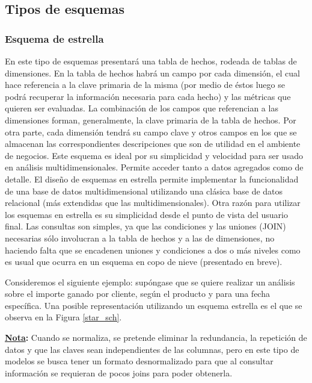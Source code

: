 \documentclass[a4paper,11pt]{article}
\begin{document}
    
    \subsection{Tipos de esquemas}
    
    \subsubsection{Esquema de estrella}
    
    En este tipo de esquemas presentará una tabla de hechos, rodeada de tablas de dimensiones. En la tabla de hechos habrá un campo por cada dimensión, el
    cual hace referencia a la clave primaria de la misma (por medio de éstos luego se podrá recuperar la información necesaria para cada hecho) 
    y las métricas que quieren ser evaluadas. La combinación de los campos que referencian a las dimensiones forman, generalmente, la clave primaria de la
    tabla de hechos. Por otra parte, cada dimensión tendrá su campo clave y otros campos en los que se almacenan las correspondientes descripciones que son 
    de utilidad en el ambiente de negocios. Este esquema es ideal por su simplicidad y velocidad para ser usado en análisis multidimensionales. Permite 
    acceder tanto a datos agregados como de detalle. El diseño de esquemas en estrella permite implementar la funcionalidad de una base de datos 
    multidimensional utilizando una clásica base de datos relacional (más extendidas que las multidimensionales). Otra razón para utilizar los esquemas en 
    estrella es su simplicidad desde el punto de vista del usuario final. Las consultas son simples, ya que las condiciones y las uniones (JOIN) 
    necesarias sólo involucran a la tabla de hechos y a las de dimensiones, no haciendo falta que se encadenen uniones y condiciones a dos o más niveles como 
    es usual que ocurra en un esquema en copo de nieve (presentado en breve).\par
    Consideremos el siguiente ejemplo: supóngase que se quiere realizar un análisis sobre el importe ganado por cliente, según el producto y para una fecha
    específica. Una posible representación utilizando un esquema estrella es el que se observa en la Figura \ref{star_sch}.\par
    
    \textbf{\underline{Nota}:} Cuando se normaliza, se pretende eliminar la redundancia, la repetición de datos y que las claves sean independientes de
    las columnas, pero en este tipo de modelos se busca tener un formato desnormalizado para que al consultar información se requieran de pocos joins para
    poder obtenerla.
    
\end{document}
